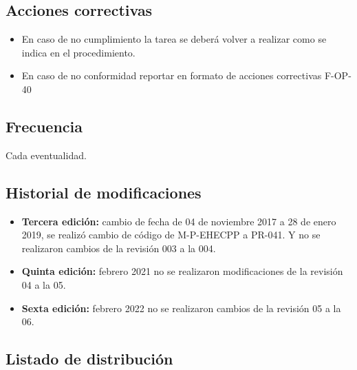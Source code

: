 \subsection{Acciones correctivas}

\begin{itemize}
	\item En caso de no cumplimiento la tarea se deberá volver a realizar como se indica en el procedimiento.
	\item En caso de no conformidad reportar en formato de acciones correctivas F-OP-40
\end{itemize}

\subsection{Frecuencia}

Cada eventualidad.

\subsection{Historial de modificaciones}

\begin{itemize}
	\item \textbf{Tercera edición:} cambio de fecha de 04 de noviembre 2017 a 28 de enero 2019, se realizó cambio de código de M-P-EHECPP a PR-041. Y no se realizaron cambios de la revisión 003 a la 004.
	\item \textbf{Quinta edición:} febrero 2021 no se realizaron modificaciones de la revisión 04 a la 05.
	\item \textbf{Sexta edición:} febrero 2022 no se realizaron cambios de la revisión 05 a la 06.
\end{itemize}

\subsection{Listado de distribución}

